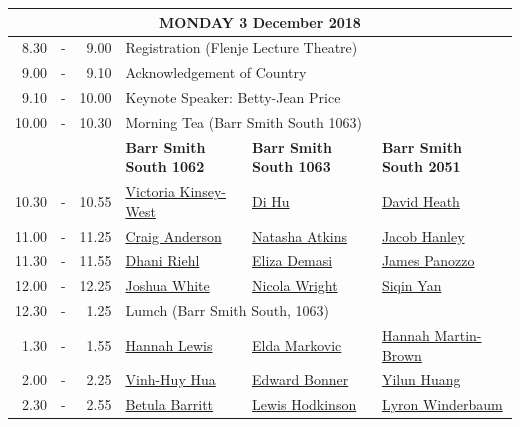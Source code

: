 \documentclass[twoside,14pt,a4paper,notitlepage]{memoir}
\begin{document}
\renewcommand{\arraystretch}{1.4}
\begin{center}
\begin{tabular}{rcr|p{3.6cm}|p{3.6cm}|p{3.6cm}}
\multicolumn{6}{c}{{\large MONDAY 3 December 2018}} \\ \hline
8.30 & - & 9.00 & \multicolumn{3}{l}{Registration (Flenje Lecture Theatre)} \\ \hline
9.00 & - & 9.10 & \multicolumn{3}{l}{Acknowledgement of Country} \\ \hline
9.10 & - & 10.00 & \multicolumn{3}{l}{Keynote Speaker: Betty-Jean Price} \\ \hline
10.00 & - & 10.30 & \multicolumn{3}{l}{Morning Tea (Barr Smith South 1063)} \\ \hline
 & & & \textbf{Barr Smith South 1062} & \textbf{Barr Smith South 1063} & \textbf{Barr Smith South 2051} \\ \hline
 10.30 & - & 10.55 & 
 \hyperref[aut:west]{Victoria Kinsey-West} & 
 \hyperref[aut:hu]{Di Hu} &  
 \hyperref[aut:heath]{David Heath} \\ \hline
11.00 & - & 11.25 &
 \hyperref[aut:anderson]{Craig Anderson} &
 \hyperref[aut:atkins]{Natasha Atkins} &
 \hyperref[aut:hanley]{Jacob Hanley} \\ \hline
11.30 & - & 11.55 &
 \hyperref[aut:riehl]{Dhani Riehl} &
 \hyperref[aut:demasi]{Eliza Demasi} &
 \hyperref[aut:panozzo]{James Panozzo} \\ \hline
12.00 & - & 12.25 &
 \hyperref[aut:white]{Joshua White} &
 \hyperref[aut:wright]{Nicola Wright} &
 \hyperref[aut:yan]{Siqin Yan} \\ \hline
12.30 & - & 1.25 & \multicolumn{3}{l}{Lumch (Barr Smith South, 1063)} \\ \hline
1.30 & - & 1.55 &
 \hyperref[aut:lewis]{Hannah Lewis} &
 \hyperref[aut:markovic]{Elda Markovic} &
 \hyperref[aut:brown]{Hannah Martin-Brown} \\ \hline
2.00 & - & 2.25 &
 \hyperref[aut:hua]{Vinh-Huy Hua} &
 \hyperref[aut:bonner]{Edward Bonner} &
 \hyperref[aut:huang]{Yilun Huang} \\ \hline
2.30 & - & 2.55 &
 \hyperref[aut:barritt]{Betula Barritt} &
 \hyperref[aut:hodkinson]{Lewis Hodkinson} &
 \hyperref[aut:winderbaum]{Lyron Winderbaum} \\ \hline
\end{tabular}
\end{center}
\vfill
\end{document}
